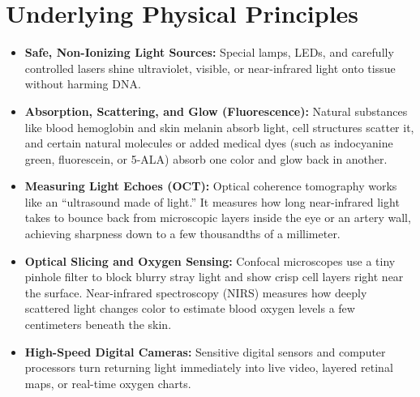 \section{Underlying Physical Principles}
\begin{itemize}
  \item \textbf{Safe, Non-Ionizing Light Sources:} Special lamps, LEDs, and carefully controlled lasers shine ultraviolet, visible, or near-infrared light onto tissue without harming DNA.
  \item \textbf{Absorption, Scattering, and Glow (Fluorescence):} Natural substances like blood hemoglobin and skin melanin absorb light, cell structures scatter it, and certain natural molecules or added medical dyes (such as indocyanine green, fluorescein, or 5-ALA) absorb one color and glow back in another.
  \item \textbf{Measuring Light Echoes (OCT):} Optical coherence tomography works like an ``ultrasound made of light.'' It measures how long near-infrared light takes to bounce back from microscopic layers inside the eye or an artery wall, achieving sharpness down to a few thousandths of a millimeter.
  \item \textbf{Optical Slicing and Oxygen Sensing:} Confocal microscopes use a tiny pinhole filter to block blurry stray light and show crisp cell layers right near the surface. Near-infrared spectroscopy (NIRS) measures how deeply scattered light changes color to estimate blood oxygen levels a few centimeters beneath the skin.
  \item \textbf{High-Speed Digital Cameras:} Sensitive digital sensors and computer processors turn returning light immediately into live video, layered retinal maps, or real-time oxygen charts.
\end{itemize}

